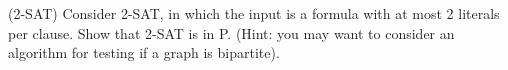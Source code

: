 \begin{questions}

  \newpage
 
  \question[15] (2-SAT) Consider 2-SAT, in which the input is a formula
  with at most 2 literals per clause. Show that 2-SAT is in P. (Hint:
  you may want to consider an algorithm for testing if a graph is
  bipartite).
\end{questions}


